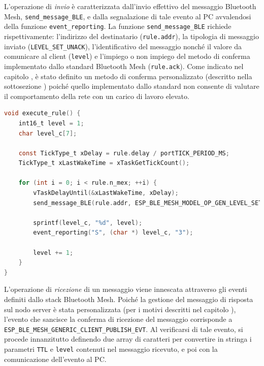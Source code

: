 \noindent L'operazione di \textit{invio} è caratterizzata dall'invio effettivo del messaggio Bluetooth Mesh, \texttt{send\_message\_BLE}, e dalla segnalazione di tale evento al PC avvalendosi della funzione \texttt{event\_reporting}. La funzione \texttt{send\_message\_BLE} richiede rispettivamente: l'indirizzo del destinatario (\texttt{rule.addr}), la tipologia di messaggio inviato (\texttt{LEVEL\_SET\_UNACK}), l'identificativo del messaggio nonché il valore da comunicare al client (\texttt{level}) e l'impiego o non impiego del metodo di conferma implementato dallo standard Bluetooth Mesh (\texttt{rule.ack}). Come indicato nel capitolo , è stato definito un metodo di conferma personalizzato (descritto nella sottosezione ) poiché quello implementato dallo standard non consente di valutare il comportamento della rete con un carico di lavoro elevato.\\

\begin{lstlisting}[language=C, caption= evento di invio di un messaggio Bluetooth Mesh]
void execute_rule() {
    int16_t level = 1;
    char level_c[7];

    const TickType_t xDelay = rule.delay / portTICK_PERIOD_MS;
    TickType_t xLastWakeTime = xTaskGetTickCount();

    for (int i = 0; i < rule.n_mex; ++i) {
        vTaskDelayUntil(&xLastWakeTime, xDelay);
        send_message_BLE(rule.addr, ESP_BLE_MESH_MODEL_OP_GEN_LEVEL_SET_UNACK, level);
        
        sprintf(level_c, "%d", level);
        event_reporting("S", (char *) level_c, "3");
        
        level += 1;
    }
}
\end{lstlisting}

\noindent L'operazione di \textit{ricezione} di un messaggio viene innescata attraverso gli eventi definiti dallo stack Bluetooth Mesh. Poiché la gestione del messaggio di risposta sul nodo server è stata personalizzata (per i motivi descritti nel capitolo ), l'evento che sancisce la conferma di ricezione del messaggio corrisponde a \texttt{ESP\_BLE\_MESH\_GENERIC\_CLIENT\_PUBLISH\_EVT}. Al verificarsi di tale evento, si procede innanzitutto definendo due array di caratteri per convertire in stringa i parametri \texttt{TTL} e \texttt{level} contenuti nel messaggio ricevuto, e poi con la comunicazione dell'evento al PC.\\

